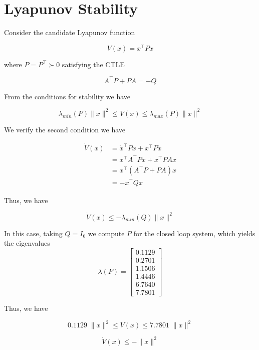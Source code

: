 \section{\textbf{Lyapunov Stability}}

\noindent Consider the candidate Lyapunov function

$$V(x) = x^\top P x$$

\noindent where $P = P^\top \succ 0$ satisfying the CTLE

$$A^\top P + PA = -Q$$

\noindent From the conditions for stability we have

$$\lambda_{min}(P) \|x\|^2 \leq V(x) \leq \lambda_{max}(P) \|x\|^2$$

\noindent We verify the second condition we have

$$\begin{aligned}
    \dot{V}(x) &= \dot{x}^\top P x + x^\top P \dot{x} \\
               &= x^\top A^\top P x + x^\top P Ax \\
               &= x^\top (A^\top P + PA) x \\
               &= -x^\top Q x
\end{aligned}$$

\noindent Thus, we have

$$\dot{V}(x) \leq -\lambda_{min}(Q) \|x\|^2$$

\noindent In this case, taking $Q = I_6$ we compute $P$ for the closed loop system, which yields the eigenvalues
$$\lambda(P) = \begin{bmatrix}
    0.1129 \\
    0.2701 \\
    1.1506 \\
    1.4446 \\
    6.7640 \\
    7.7801
\end{bmatrix}$$

\noindent Thus, we have

$$0.1129 \; \|x\|^2 \leq V(x) \leq 7.7801 \; \|x\|^2$$

$$\dot{V}(x) \leq - \| x \|^2$$